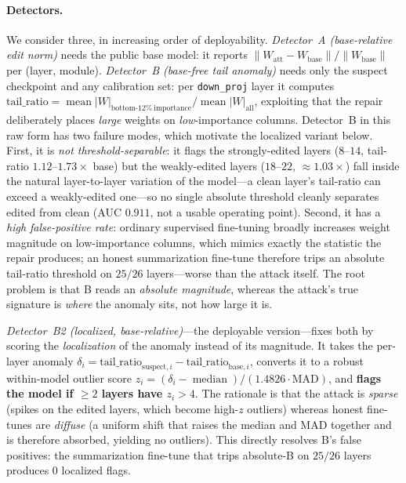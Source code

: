 \paragraph{Detectors.}
We consider three, in increasing order of deployability.
\emph{Detector~A (base-relative edit norm)} needs the public base model: it reports
$\lVert W_{\text{att}}-W_{\text{base}}\rVert / \lVert W_{\text{base}}\rVert$ per (layer, module).
\emph{Detector~B (base-free tail anomaly)} needs only the suspect checkpoint and any calibration set:
per \texttt{down\_proj} layer it computes
$\text{tail\_ratio} = \operatorname{mean}|W|_{\text{bottom-}12\%\ \text{importance}} / \operatorname{mean}|W|_{\text{all}}$,
exploiting that the repair deliberately places \emph{large} weights on \emph{low}-importance columns.
Detector~B in this raw form has two failure modes, which motivate the localized variant below.
First, it is \emph{not threshold-separable}: it flags the strongly-edited layers ($8$--$14$,
tail-ratio $1.12$--$1.73\times$ base) but the weakly-edited layers ($18$--$22$, $\approx 1.03\times$)
fall inside the natural layer-to-layer variation of the model---a clean layer's tail-ratio can exceed
a weakly-edited one---so no single absolute threshold cleanly separates edited from clean (AUC
$0.911$, not a usable operating point). Second, it has a \emph{high false-positive rate}: ordinary
supervised fine-tuning broadly increases weight magnitude on low-importance columns, which mimics
exactly the statistic the repair produces; an honest summarization fine-tune therefore trips an
absolute tail-ratio threshold on $25/26$ layers---worse than the attack itself. The root problem is
that B reads an \emph{absolute magnitude}, whereas the attack's true signature is \emph{where} the
anomaly sits, not how large it is.

\emph{Detector~B2 (localized, base-relative)}---the deployable version---fixes both by scoring the
\emph{localization} of the anomaly instead of its magnitude. It takes the per-layer anomaly
$\delta_i = \text{tail\_ratio}_{\text{suspect},i} - \text{tail\_ratio}_{\text{base},i}$, converts it to a
robust within-model outlier score $z_i = (\delta_i - \operatorname{median})/(1.4826\cdot\text{MAD})$,
and \textbf{flags the model if $\geq 2$ layers have $z_i > 4$}. The rationale is that the attack is
\emph{sparse} (spikes on the edited layers, which become high-$z$ outliers) whereas honest fine-tunes
are \emph{diffuse} (a uniform shift that raises the median and MAD together and is therefore absorbed,
yielding no outliers). This directly resolves B's false positives: the summarization fine-tune that
trips absolute-B on $25/26$ layers produces $0$ localized flags.

